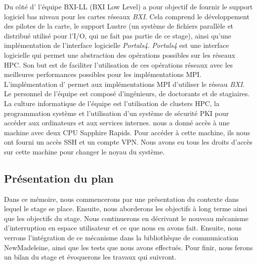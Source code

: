 Du côté d'\atos{} l'équipe BXI-LL (BXI Low Level) a pour objectif de fournir le support logiciel bas niveau pour les cartes réseaux \emph{BXI}.
Cela comprend le développement des pilotes de la carte, le support Lustre (un système de fichiers parallèle et distribué utilisé pour l'I/O, qui ne fait pas partie de ce stage), ainsi qu'une implémentation de l'interface logicielle \emph{Portals4}.
\emph{Portals4} est une interface logicielle qui permet une abstraction des opérations possibles sur les réseaux HPC.
Son but est de faciliter l'utilisation de ces opérations réseaux avec les meilleures performances possibles pour les implémentations MPI. %
L'implémentation d'\atos{} permet aux implémentations MPI d'utiliser le réseau \emph{BXI}.
Le personnel de l'équipe est composé d'ingénieurs, de doctorants et de stagiaires.
La culture informatique de l'équipe est l'utilisation de clusters HPC, la programmation système et l'utilisation d'un système de sécurité PKI pour accéder aux ordinateurs et aux services internes.
\atos{} nous a donné accès à une machine avec deux CPU \intel{} Sapphire Rapids.
Pour accéder à cette machine, ils nous ont fourni un accès SSH et un compte VPN.
Nous avons eu tous les droits d'accès sur cette machine pour changer le noyau du système.

\subsection{Présentation du plan}

Dans ce mémoire, nous commencerons par une présentation du contexte dans lequel le stage se place.
Ensuite, nous aborderons les objectifs à long terme ainsi que les objectifs du stage.
Nous continuerons en décrivant le nouveau mécanisme d'interruption en espace utilisateur et ce que nous en avons fait.
Ensuite, nous verrons l'intégration de ce mécanisme dans la bibliothèque de communication NewMadeleine, ainsi que les tests que nous avons effectués.
Pour finir, nous ferons un bilan du stage et évoquerons les travaux qui suivront.
